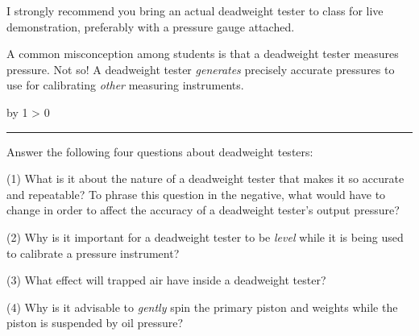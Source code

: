 \documentclass[12pt,a4paper]{article}
\def\oppgave{
            \advance\questnum by 1
            \ifnum \questnum > 0
                 \hrule
                 \vskip 3pt
                 \leftline{Oppgave \the\questnum}
                 \vskip 3pt \fi}
\begin{document}
I strongly recommend you bring an actual deadweight tester to class for live demonstration, preferably with a pressure gauge attached.  

\vskip 10pt

A common misconception among students is that a deadweight tester measures pressure.  Not so!  A deadweight tester {\it generates} precisely accurate pressures to use for calibrating {\it other} measuring instruments.


\vfil \eject 



\oppgave{} 

Answer the following four questions about deadweight testers:


\vskip 10pt {\narrower \noindent \baselineskip5pt

\noindent
(1) What is it about the nature of a deadweight tester that makes it so accurate and repeatable?  To phrase this question in the negative, what would have to change in order to affect the accuracy of a deadweight tester's output pressure?

\par} \vskip 10pt




\vskip 10pt {\narrower \noindent \baselineskip5pt

\noindent
(2) Why is it important for a deadweight tester to be {\it level} while it is being used to calibrate a pressure instrument?

\par} \vskip 10pt



\vskip 10pt {\narrower \noindent \baselineskip5pt

\noindent
(3) What effect will trapped air have inside a deadweight tester?

\par} \vskip 10pt




\vskip 10pt {\narrower \noindent \baselineskip5pt

\noindent
(4) Why is it advisable to {\it gently} spin the primary piston and weights while the piston is suspended by oil pressure?

\par} \vskip 10pt
\end{document}
